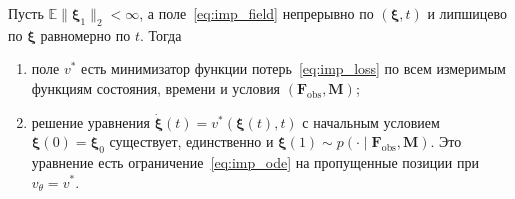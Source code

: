 \begin{theorem}\label{thm:imp_correct}
Пусть $\mathbb{E}\|\boldsymbol{\xi}_1\|_2 < \infty$, а поле~\eqref{eq:imp_field} непрерывно по $(\boldsymbol{\xi}, t)$ и липшицево по $\boldsymbol{\xi}$ равномерно по $t$. Тогда
\begin{enumerate}
    \item[(а)] поле $v^{*}$ есть минимизатор функции потерь~\eqref{eq:imp_loss} по всем измеримым функциям состояния, времени и условия $(\mathbf{F}_{\mathrm{obs}}, \mathbf{M})$;
    \item[(б)] решение уравнения $\dot{\boldsymbol{\xi}}(t) = v^{*}(\boldsymbol{\xi}(t), t)$ с начальным условием $\boldsymbol{\xi}(0) = \boldsymbol{\xi}_0$ существует, единственно и $\boldsymbol{\xi}(1) \sim p(\cdot \mid \mathbf{F}_{\mathrm{obs}}, \mathbf{M})$. Это уравнение есть ограничение~\eqref{eq:imp_ode} на пропущенные позиции при $v_{\theta} = v^{*}$.
\end{enumerate}
\end{theorem}
